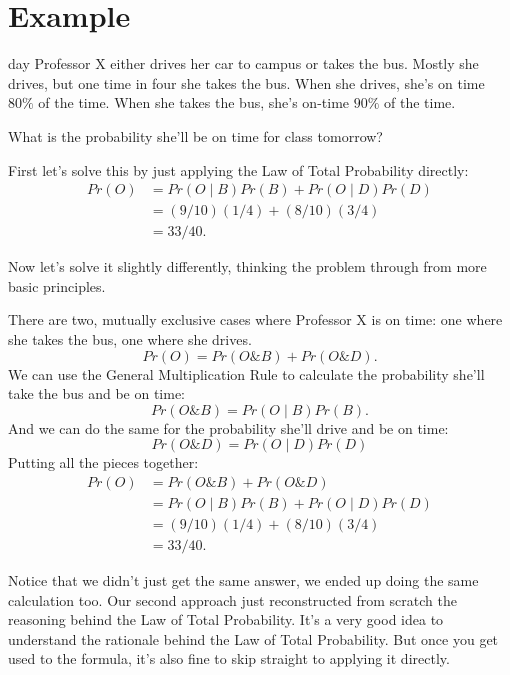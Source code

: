 \documentclass[justified]{tufte-book}
\newcommand{\given}{\mid}
\renewcommand{\wedge}{\mathbin{\&}}
\newcommand{\p}{Pr}
\theoremstyle{definition}
\theoremstyle{definition}
\theoremstyle{definition}
\theoremstyle{remark}
\begin{document}
\hypertarget{example}{%
\section{Example}\label{example}}

 day Professor X either drives her car to campus or takes the bus. Mostly she drives, but one time in four she takes the bus. When she drives, she's on time \(80\%\) of the time. When she takes the bus, she's on-time \(90\%\) of the time.

What is the probability she'll be on time for class tomorrow?

First let's solve this by just applying the Law of Total Probability directly:
\[
  \begin{aligned}
    \p(O) &= \p(O \given B)\p(B) + \p(O \given D)\p(D)\\
          &= (9/10)(1/4) + (8/10)(3/4)\\
          &= 33/40.
  \end{aligned}
\]

Now let's solve it slightly differently, thinking the problem through from more basic principles.

There are two, mutually exclusive cases where Professor X is on time: one where she takes the bus, one where she drives.
\[ \p(O) = \p(O \wedge B) + \p(O \wedge D). \]
We can use the General Multiplication Rule to calculate the probability she'll take the bus and be on time:
\[ \p(O \wedge B) = \p(O \given B)\p(B). \]
And we can do the same for the probability she'll drive and be on time:
\[ \p(O \wedge D) = \p(O \given D)\p(D)\]
Putting all the pieces together:
\[
  \begin{aligned}
    \p(O) &= \p(O \wedge B) + \p(O \wedge D)\\
          &= \p(O \given B)\p(B) + \p(O \given D)\p(D)\\
          &= (9/10)(1/4) + (8/10)(3/4)\\
          &= 33/40.
  \end{aligned}
\]

Notice that we didn't just get the same answer, we ended up doing the same calculation too. Our second approach just reconstructed from scratch the reasoning behind the Law of Total Probability. It's a very good idea to understand the rationale behind the Law of Total Probability. But once you get used to the formula, it's also fine to skip straight to applying it directly.
\end{document}
